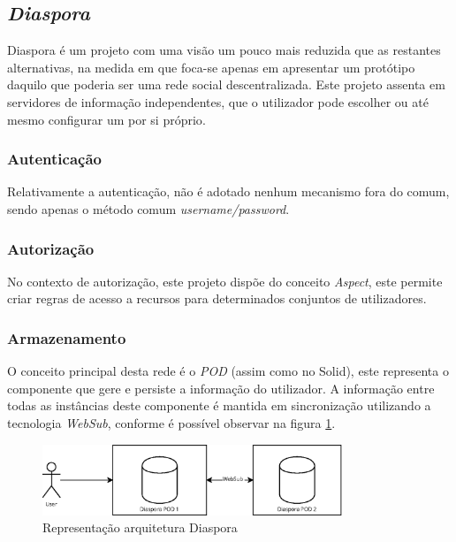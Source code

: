 \subsection{\emph{Diaspora}}
Diaspora é um projeto com uma visão um pouco mais reduzida que as restantes alternativas, na medida em que foca-se apenas em apresentar um protótipo daquilo que poderia ser uma rede social descentralizada. Este projeto assenta em servidores de informação independentes, que o utilizador pode escolher ou até mesmo configurar um por si próprio\cite{diaspora_wiki}.

\subsubsection{Autenticação}
Relativamente a autenticação, não é adotado nenhum mecanismo fora do comum, sendo apenas o método comum \emph{username/password}.

\subsubsection{Autorização}
No contexto de autorização, este projeto dispõe do conceito \emph{Aspect}, este permite criar regras de acesso a recursos para determinados conjuntos de utilizadores\cite{diaspora_wiki}.

\subsubsection{Armazenamento}
O conceito principal desta rede é o \emph{\acrshort{POD}} (assim como no Solid), este representa o componente que gere e persiste a informação do utilizador. A informação entre todas as instâncias deste componente é mantida em sincronização utilizando a tecnologia \emph{WebSub}, conforme é possível observar na figura \ref{estado_arte_representacao_diaspora}\cite{diaspora_wiki}.

\begin{figure}[H]
    \includegraphics[width=0.8\textwidth]{figures/estado_arte-Diaspora.eps}
    \caption{Representação arquitetura Diaspora}
    \label{estado_arte_representacao_diaspora}
\end{figure}

